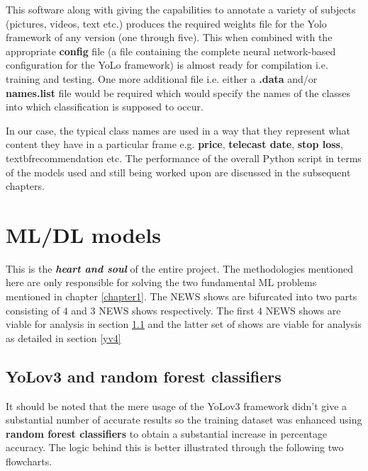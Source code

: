 This software along with giving the capabilities to annotate a variety of subjects (pictures, videos, text etc.) produces the required weights file for the Yolo framework of any version (one through five). This when combined with the appropriate {\selectfont \textbf{config}} file (a file containing the complete neural network-based configuration for the YoLo framework) is almost ready for compilation i.e. training and testing. One more additional file i.e. either a {\selectfont \textbf{.data}} and/or {\selectfont \textbf{names.list}} file would be required which would specify the names of the classes into which classification is supposed to occur. \par

In our case, the typical class names are used in a way that they represent what content they have in a particular frame e.g. \textbf{price}, \textbf{telecast date}, \textbf{stop loss}, textbf{recommendation} etc. The performance of the overall Python script in terms of the models used and still being worked upon are discussed in the subsequent chapters.

\section{ML/DL models}

This is the \textbf{\textit{heart and soul}} of the entire project. The methodologies mentioned here are only responsible for solving the two fundamental ML problems mentioned in chapter \ref{chapter1}. The NEWS shows are bifurcated into two parts consisting of $4$ and $3$ NEWS shows respectively. The first $4$ NEWS shows are viable for analysis in section \ref{yv3} and the latter set of shows are viable for analysis as detailed in section \ref{yv4}

\subsection{YoLov3 and random forest classifiers} \label{yv3}

It should be noted that the mere usage of the YoLov3 framework didn’t give a substantial number of accurate results so the training dataset was enhanced using \textbf{random forest classifiers} to obtain a substantial increase in percentage accuracy. The logic behind this is better illustrated through the following two flowcharts.

